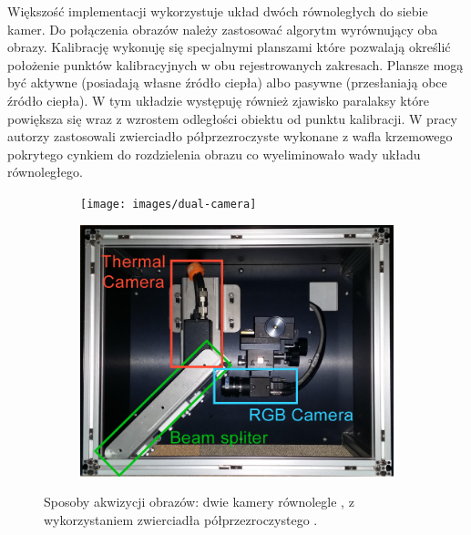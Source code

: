 Większość implementacji wykorzystuje układ dwóch równoległych do siebie kamer. Do połączenia obrazów należy zastosować algorytm wyrównujący oba obrazy. Kalibrację wykonuję się specjalnymi  planszami które pozwalają określić położenie punktów kalibracyjnych w obu rejestrowanych zakresach. Plansze mogą być aktywne (posiadają własne źródło ciepła) albo pasywne (przesłaniają obce źródło ciepła). W tym układzie występuję również zjawisko paralaksy które powiększa się wraz z wzrostem odległości obiektu od punktu kalibracji. W pracy  \cite{hwang2015multispectral} autorzy zastosowali zwierciadło półprzezroczyste wykonane z wafla krzemowego pokrytego cynkiem do rozdzielenia obrazu co wyeliminowało wady układu równoległego.

\begin{figure}[h]
	\centering
	\begin{subfigure}{0.45\textwidth}
		\centering
		 \texttt{[image: images/dual-camera]}
		\subcaption{\label{dual_camera}}
	\end{subfigure}
	\begin{subfigure}{0.45\textwidth}
		\centering
		 \includegraphics[width=1\textwidth]{images/multispectral}
		\subcaption{\label{multispectral}}
	\end{subfigure}
	
	\caption{\label{fig:cameras_systems}Sposoby akwizycji obrazów:  \protect{} dwie kamery równolegle \cite{lee2015robust}, \protect{} z wykorzystaniem zwierciadła półprzezroczystego \cite{hwang2015multispectral}.}
\end{figure}

